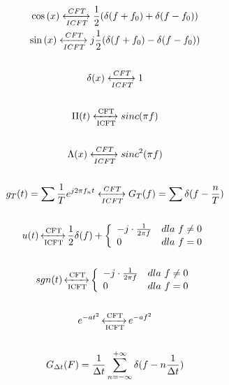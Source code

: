 \begin{multicols}{2}
        \noindent
        \begin{gather*}
            \cos{(x)} \xleftrightarrow[ICFT]{CFT} \frac{1}{2}(\delta(f+f_0) + \delta(f-f_0))\\
            \sin{(x)} \xleftrightarrow[ICFT]{CFT} j\frac{1}{2}(\delta(f+f_0) - \delta(f-f_0))\\\\
            \delta(x) \xleftrightarrow[ICFT]{CFT} 1\\\\
            \Pi(t) \xleftrightarrow[\text{ICFT}]{\text{CFT}} sinc(\pi f)\\\\
            \Lambda(x) \xleftrightarrow[ICFT]{CFT} sinc^2(\pi f)\\\\
            g_T(t) = \sum \frac{1}{T} e^{j2\pi f_n t} \xleftrightarrow[ICFT]{CFT} G_T(f) = \sum \delta(f-\frac{n}{T})\\\\
            u(t) \operatorname{\xleftrightarrow[\text{ICFT}]{\text{CFT}}} \frac{1}{2}\delta(f) + \left\{\begin{array}{l l}
                -j\cdot\frac{1}{2\pi f} & dla\ f\ne 0\\
                0 & dla\ f=0
            \end{array}\right.\\\\
            sgn(t) \operatorname{\xleftrightarrow[\text{ICFT}]{\text{CFT}}} \left\{\begin{array}{l l}
                -j\cdot\frac{1}{2\pi f} & dla\ f\ne0\\
                0 & dla\ f=0
            \end{array}\right.\\\\
            e^{-at^2} \operatorname{\xleftrightarrow[\text{ICFT}]{\text{CFT}}} e^{-af^2}\\\\
            G_{\Delta t}(F) = \frac{1}{\Delta t}\sum_{n=-\infty}^{+\infty} \delta(f-n \frac{1}{\Delta t})
        \end{gather*}
    \end{multicols}


